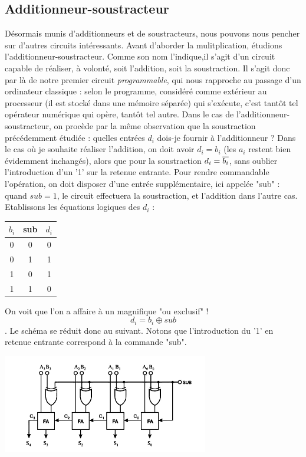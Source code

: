 \subsection{Additionneur-soustracteur}
Désormais munis d'additionneurs et de soustracteurs, nous pouvons nous pencher sur d'autres circuits intéressants. Avant d'aborder la mulitplication, étudions l'additionneur-soustracteur.
Comme son nom l'indique,il s'agit d'un circuit capable de réaliser, à volonté, soit l'addition, soit la soustraction. Il s'agit donc par là de notre premier circuit {\it programmable}, qui
nous rapproche au passage d'un ordinateur classique : selon le programme, considéré comme extérieur au processeur (il est stocké dans une mémoire séparée) qui s'exécute, c'est tantôt tel opérateur numérique qui opère, tantôt tel autre.
Dans le cas de l'additionneur-soustracteur, on procède par la même observation que la soustraction précédemment étudiée : quelles entrées $d_i$ dois-je fournir à l'additionneur ?
Dans le cas où je souhaite réaliser l'addition, on doit avoir $d_i=b_i$ (les $a_i$ restent bien évidemment inchangés), alors que pour la soustraction $d_i=\overline{b_i}$, sans oublier l'introduction d'un '1' sur
la retenue entrante.
Pour rendre commandable l'opération, on doit disposer d'une entrée supplémentaire, ici appelée "sub" : quand $sub=1$, le circuit effectuera la soustraction, et l'addition
dans l'autre cas. Etablissons les équations logiques des $d_i$ :
\begin{center}
   \centering
   \begin{tabular}{|c|c||c|}
     \hline
     $b_i$ & sub &  $d_i$ \\ \hline
         0 &   0 &  0    \\ \hline
         0 &   1 &  1    \\ \hline
         1 &   0 &  1    \\ \hline
         1 &   1 &  0    \\ \hline
   \end{tabular}
\end{center}
On voit que l'on a affaire à un magnifique "ou exclusif" ! $$d_i=b_i \oplus sub$$. Le schéma se réduit donc au suivant. Notons que l'introduction du '1' en retenue entrante correspond à la commande "sub".
\begin{center}
  \centering
  \includegraphics[width=9cm]{./figures/sub-2.png}
\end{center}

